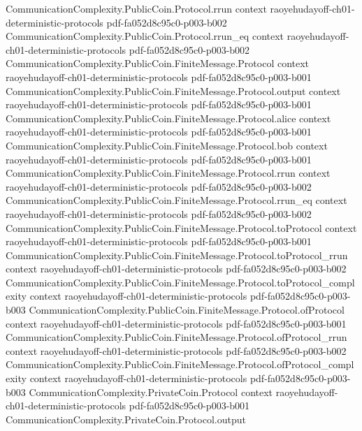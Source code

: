 \begin{theorem}
  {CommunicationComplexity.PublicCoin.Protocol.rrun}
  {context}
  {raoyehudayoff-ch01-deterministic-protocols}
  {pdf-fa052d8c95c0-p003-b002}
\proofstep
  {CommunicationComplexity.PublicCoin.Protocol.rrun_eq}
  {context}
  {raoyehudayoff-ch01-deterministic-protocols}
  {pdf-fa052d8c95c0-p003-b002}
\proofstep
  {CommunicationComplexity.PublicCoin.FiniteMessage.Protocol}
  {context}
  {raoyehudayoff-ch01-deterministic-protocols}
  {pdf-fa052d8c95c0-p003-b001}
\proofstep
  {CommunicationComplexity.PublicCoin.FiniteMessage.Protocol.output}
  {context}
  {raoyehudayoff-ch01-deterministic-protocols}
  {pdf-fa052d8c95c0-p003-b001}
\proofstep
  {CommunicationComplexity.PublicCoin.FiniteMessage.Protocol.alice}
  {context}
  {raoyehudayoff-ch01-deterministic-protocols}
  {pdf-fa052d8c95c0-p003-b001}
\proofstep
  {CommunicationComplexity.PublicCoin.FiniteMessage.Protocol.bob}
  {context}
  {raoyehudayoff-ch01-deterministic-protocols}
  {pdf-fa052d8c95c0-p003-b001}
\proofstep
  {CommunicationComplexity.PublicCoin.FiniteMessage.Protocol.rrun}
  {context}
  {raoyehudayoff-ch01-deterministic-protocols}
  {pdf-fa052d8c95c0-p003-b002}
\proofstep
  {CommunicationComplexity.PublicCoin.FiniteMessage.Protocol.rrun_eq}
  {context}
  {raoyehudayoff-ch01-deterministic-protocols}
  {pdf-fa052d8c95c0-p003-b002}
\proofstep
  {CommunicationComplexity.PublicCoin.FiniteMessage.Protocol.toProtocol}
  {context}
  {raoyehudayoff-ch01-deterministic-protocols}
  {pdf-fa052d8c95c0-p003-b001}
\proofstep
  {CommunicationComplexity.PublicCoin.FiniteMessage.Protocol.toProtocol_rrun}
  {context}
  {raoyehudayoff-ch01-deterministic-protocols}
  {pdf-fa052d8c95c0-p003-b002}
\proofstep
  {CommunicationComplexity.PublicCoin.FiniteMessage.Protocol.toProtocol_complexity}
  {context}
  {raoyehudayoff-ch01-deterministic-protocols}
  {pdf-fa052d8c95c0-p003-b003}
\proofstep
  {CommunicationComplexity.PublicCoin.FiniteMessage.Protocol.ofProtocol}
  {context}
  {raoyehudayoff-ch01-deterministic-protocols}
  {pdf-fa052d8c95c0-p003-b001}
\proofstep
  {CommunicationComplexity.PublicCoin.FiniteMessage.Protocol.ofProtocol_rrun}
  {context}
  {raoyehudayoff-ch01-deterministic-protocols}
  {pdf-fa052d8c95c0-p003-b002}
\proofstep
  {CommunicationComplexity.PublicCoin.FiniteMessage.Protocol.ofProtocol_complexity}
  {context}
  {raoyehudayoff-ch01-deterministic-protocols}
  {pdf-fa052d8c95c0-p003-b003}
\proofstep
  {CommunicationComplexity.PrivateCoin.Protocol}
  {context}
  {raoyehudayoff-ch01-deterministic-protocols}
  {pdf-fa052d8c95c0-p003-b001}
\proofstep
  {CommunicationComplexity.PrivateCoin.Protocol.output}

\end{theorem}
